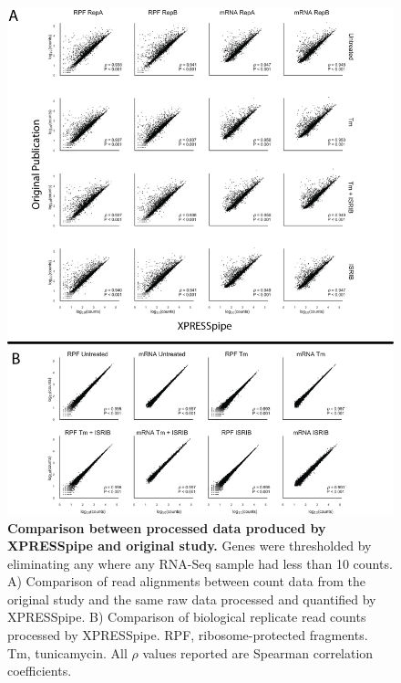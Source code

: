 \documentclass[10pt, oneside]{article}
\begin{document}
\begin{figure}
\centering
  \includegraphics[width=160mm]{figures/xpresspipe_figure2.png}
  \caption{\textbf{Comparison between processed data produced by XPRESSpipe and original study.} Genes were thresholded by eliminating any where any RNA-Seq sample had less than 10 counts. A) Comparison of read alignments between count data from the original study and the same raw data processed and quantified by XPRESSpipe. B) Comparison of biological replicate read counts processed by XPRESSpipe. RPF, ribosome-protected fragments. Tm, tunicamycin. All $\rho$ values reported are Spearman correlation coefficients.}
  \label{fig:figure2}
\end{figure}
\end{document}
